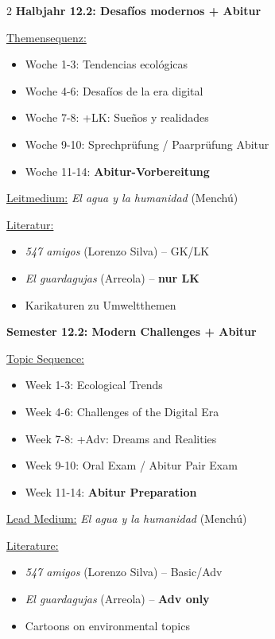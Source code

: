 \documentclass[10pt,a4paper]{article}
\begin{document}
\vspace{3mm}

\begin{paracol}{2}
\small
\textbf{Halbjahr 12.2: Desafíos modernos + Abitur}
\par\vspace{1mm}
\underline{Themensequenz:}
\begin{itemize}[noitemsep,topsep=2pt]
\item Woche 1-3: Tendencias ecológicas
\item Woche 4-6: Desafíos de la era digital
\item Woche 7-8: +LK: Sueños y realidades
\item Woche 9-10: Sprechprüfung / Paarprüfung Abitur
\item Woche 11-14: \textbf{Abitur-Vorbereitung}
\end{itemize}
\underline{Leitmedium:} \textit{El agua y la humanidad} (Menchú)
\par\vspace{1mm}
\underline{Literatur:}
\begin{itemize}[noitemsep,topsep=2pt]
\item \textit{547 amigos} (Lorenzo Silva) -- GK/LK
\item \textit{El guardagujas} (Arreola) -- \textbf{nur LK}
\item Karikaturen zu Umweltthemen
\end{itemize}
\switchcolumn
\small\color{english}
\textbf{Semester 12.2: Modern Challenges + Abitur}
\par\vspace{1mm}
\underline{Topic Sequence:}
\begin{itemize}[noitemsep,topsep=2pt]
\item Week 1-3: Ecological Trends
\item Week 4-6: Challenges of the Digital Era
\item Week 7-8: +Adv: Dreams and Realities
\item Week 9-10: Oral Exam / Abitur Pair Exam
\item Week 11-14: \textbf{Abitur Preparation}
\end{itemize}
\underline{Lead Medium:} \textit{El agua y la humanidad} (Menchú)
\par\vspace{1mm}
\underline{Literature:}
\begin{itemize}[noitemsep,topsep=2pt]
\item \textit{547 amigos} (Lorenzo Silva) -- Basic/Adv
\item \textit{El guardagujas} (Arreola) -- \textbf{Adv only}
\item Cartoons on environmental topics
\end{itemize}
\end{paracol}
\end{document}
